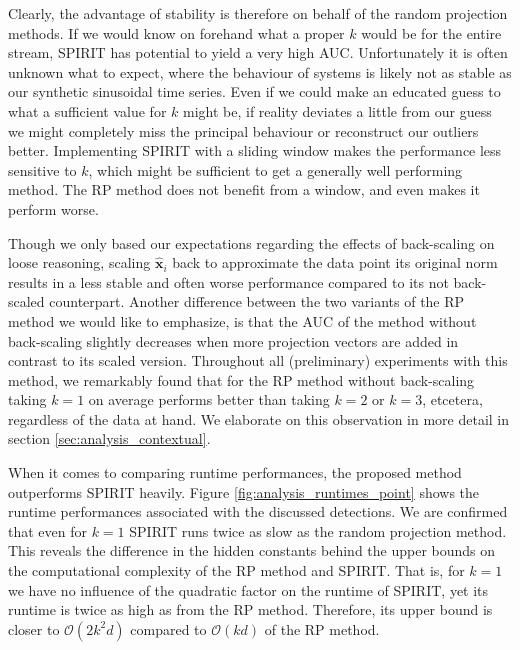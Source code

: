 Clearly, the advantage of stability is therefore on behalf of the random projection methods. If we would know on forehand what a proper $k$ would be for the entire stream, SPIRIT has potential to yield a very high AUC. Unfortunately it is often unknown what to expect, where the behaviour of systems is likely not as stable as our synthetic sinusoidal time series. Even if we could make an educated guess to what a sufficient value for $k$ might be, if reality deviates a little from our guess we might completely miss the principal behaviour or reconstruct our outliers better. Implementing SPIRIT with a sliding window makes the performance less sensitive to $k$, which might be sufficient to get a generally well performing method. The RP method does not benefit from a window, and even makes it perform worse.

Though we only based our expectations regarding the effects of back-scaling on loose reasoning, scaling $\hat{\mathbf{x}}_i$ back to approximate the data point its original norm results in a less stable and often worse performance compared to its not back-scaled counterpart. Another difference between the two variants of the RP method we would like to emphasize, is that the AUC of the method without back-scaling slightly decreases when more projection vectors are added in contrast to its scaled version. Throughout all (preliminary) experiments with this method, we remarkably found that for the RP method without back-scaling taking $k=1$ on average performs better than taking $k=2$ or $k=3$, etcetera, regardless of the data at hand. We elaborate on this observation in more detail in section \ref{sec:analysis_contextual}.

When it comes to comparing runtime performances, the proposed method outperforms SPIRIT heavily. Figure \ref{fig:analysis_runtimes_point} shows the runtime performances associated with the discussed detections. We are confirmed that even for $k=1$ SPIRIT runs twice as slow as the random projection method. This reveals the difference in the hidden constants behind the upper bounds on the computational complexity of the RP method and SPIRIT. That is, for $k=1$ we have no influence of the quadratic factor on the runtime of SPIRIT, yet its runtime is twice as high as from the RP method. Therefore, its upper bound is closer to $\mathcal{O}(2k^2d)$ compared to $\mathcal{O}(kd)$ of the RP method.

